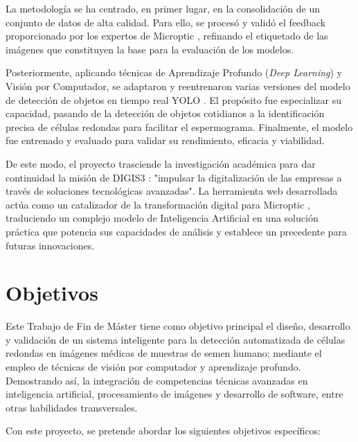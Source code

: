 \documentclass[12pt,a4paper,onecolumn,oneside]{report}
\begin{document}
La metodología se ha centrado, en primer lugar, en la consolidación de un conjunto de datos de alta calidad. Para ello, se procesó y validó el feedback 
proporcionado por los expertos de Microptic \cite{microptic}, refinando el etiquetado de las imágenes que constituyen la base para la evaluación de los modelos.

Posteriormente, aplicando técnicas de Aprendizaje Profundo (\textit{Deep Learning}) y Visión por Computador, se adaptaron y reentrenaron varias versiones 
del modelo de detección de objetos en tiempo real YOLO \cite{ultralytics_models}. El propósito fue especializar su capacidad, pasando de la detección de objetos 
cotidianos a la identificación precisa de células redondas para facilitar el espermograma. Finalmente, el modelo fue entrenado y evaluado 
para validar su rendimiento, eficacia y viabilidad.

De este modo, el proyecto trasciende la investigación académica para dar continuidad la misión de DIGIS3 \cite{digis3}: "impulsar la digitalización de las empresas a través 
de soluciones tecnológicas avanzadas". La herramienta web desarrollada actúa como un catalizador de la transformación digital para Microptic \cite{microptic}, traduciendo 
un complejo modelo de Inteligencia Artificial en una solución práctica que potencia sus capacidades de análisis y establece un precedente para futuras innovaciones.

\section{Objetivos}
\label{sec:Objetivos}

Este Trabajo de Fin de Máster tiene como objetivo principal el diseño, desarrollo y validación de un sistema inteligente para la detección automatizada de células redondas en imágenes médicas de muestras de semen humano;
mediante el empleo de técnicas de visión por computador y aprendizaje profundo. 
Demostrando así, la integración de competencias técnicas avanzadas en inteligencia artificial, procesamiento de imágenes y desarrollo de software, entre otras habilidades transversales. 

Con este proyecto, se pretende abordar los siguientes objetivos específicos: 
\end{document}
